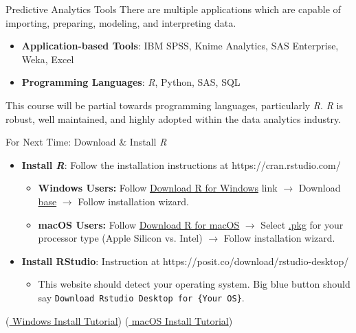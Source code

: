 \documentclass[aspectratio=169,xcolor=dvipsnames]{beamer}
\begin{document}
\begin{frame}{Predictive Analytics Tools}
There are multiple applications which are capable of importing, preparing, modeling, and interpreting data.
\vspace{.2cm}
\begin{itemize}
\setlength{\itemsep}{.25cm}
\item \textbf{Application-based Tools}: IBM SPSS, Knime Analytics, SAS Enterprise, Weka, Excel
\item \textbf{Programming Languages}: \textit{R}, Python, SAS, SQL
\end{itemize}
\vspace{.2cm}
This course will be partial towards programming languages, particularly \textit{R}. \textit{R} is robust, well maintained, and highly adopted within the data analytics industry. 
\end{frame}

\begin{frame}{For Next Time: Download \& Install \textit{R}}
\begin{itemize}
\setlength{\itemsep}{.5cm}
\item \textbf{Install \textit{R}}: Follow the installation instructions at {\color{blue}https://cran.rstudio.com/}
\begin{itemize}
\setlength{\itemsep}{.25cm}
	\item \textbf{Windows Users:} Follow {\color{blue}\underline{Download R for Windows}} link $\rightarrow$ Download {\color{blue}\underline{base}} $\rightarrow$ Follow installation wizard.
	\item \textbf{macOS Users:} Follow {\color{blue}\underline{Download R for macOS}} $\rightarrow$ Select {\color{blue}\underline{.pkg}} for your processor type (Apple Silicon vs. Intel) $\rightarrow$ Follow installation wizard.
\end{itemize}
\item \textbf{Install RStudio}: Instruction at {\color{blue}https://posit.co/download/rstudio-desktop/}
\begin{itemize}
	\item This website should detect your operating system. Big blue button should say \texttt{Download Rstudio Desktop for \{Your OS\}}.
\end{itemize}
\end{itemize}
\vspace{0.5cm}
(\href{https://www.youtube.com/watch?v=fJS6iYeSDTM}{\color{blue} Windows Install Tutorial})
\hspace{6cm}
(\href{https://www.youtube.com/watch?v=sjcPE7Jbzbg}{\color{blue} macOS Install Tutorial})
\end{frame}
\end{document}

